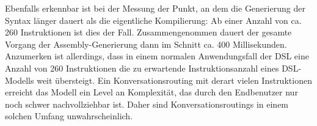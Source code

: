 \newline
Ebenfalls erkennbar ist bei der Messung der Punkt, an dem die Generierung der Syntax länger dauert als die eigentliche Kompilierung: Ab einer Anzahl von ca. 260 Instruktionen ist dies der Fall.  Zusammengenommen dauert der gesamte Vorgang der Assembly-Generierung dann im Schnitt ca. 400 Millisekunden. Anzumerken ist allerdings, dass in einem normalen Anwendungsfall der DSL eine Anzahl von 260 Instruktionen die zu erwartende Instruktionsanzahl eines DSL-Modells weit übersteigt. Ein Konversationsrouting mit derart vielen Instruktionen erreicht das Modell ein Level an Komplexität, das durch den Endbenutzer nur noch schwer nachvollziehbar ist. Daher sind Konversationsroutings in einem solchen Umfang unwahrscheinlich.  
